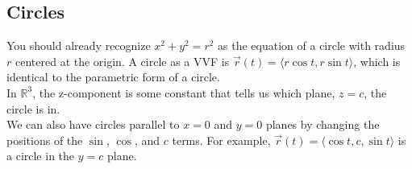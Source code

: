 \subsection{Circles}
\noindent
You should already recognize $x^2 + y^2 = r^2$ as the equation of a circle with radius $r$ centered at the origin. A circle as a VVF is $\vec{r}(t) = \langle r\cos{t}, r\sin{t} \rangle$, which is identical to the parametric form of a circle.\\
In $\mathbb{R}^3$, the z-component is some constant that tells us which plane, $z=c$, the circle is in.\\ 
We can also have circles parallel to $x=0$ and $y=0$ planes by changing the positions of the $\sin$, $\cos$, and $c$ terms. For example, $\vec{r}(t) = \langle \cos{t}, c, \sin{t} \rangle$ is a circle in the $y=c$ plane.